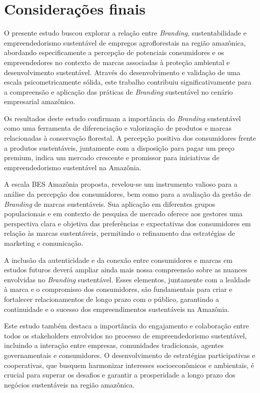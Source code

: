 \chapter{Considerações finais}

O presente estudo buscou explorar a relação entre \textit{Branding}, sustentabilidade e empreendedorismo sustentável de empregos agroflorestais na região amazônica, abordando especificamente a percepção de potenciais consumidores e os empreendedores no contexto de marcas associadas à proteção ambiental e desenvolvimento sustentável. Através do desenvolvimento e validação de uma escala psicometricamente sólida, este trabalho contribuiu significativamente para a compreensão e aplicação das práticas de \textit{Branding} sustentável no cenário empresarial amazônico.

Os resultados deste estudo confirmam a importância do \textit{Branding} sustentável como uma ferramenta de diferenciação e valorização de produtos e marcas relacionadas à conservação florestal. A percepção positiva dos consumidores frente a produtos sustentáveis, juntamente com a disposição para pagar um preço premium, indica um mercado crescente e promissor para iniciativas de empreendedorismo sustentável na Amazônia.

A escala BES Amazônia proposta, revelou-se um instrumento valioso para a análise da percepção dos consumidores, bem como para a avaliação da gestão de \textit{Branding} de marcas sustentáveis. Sua aplicação em diferentes grupos populacionais e em contexto de pesquisa de mercado oferece aos gestores uma perspectiva clara e objetiva das preferências e expectativas dos consumidores em relação às marcas sustentáveis, permitindo o refinamento das estratégias de marketing e comunicação.

A inclusão da autenticidade e da conexão entre consumidores e marcas em estudos futuros deverá ampliar ainda mais nossa compreensão sobre as nuances envolvidas no \textit{Branding} sustentável. Esses elementos, juntamente com a lealdade à marca e o compromisso dos consumidores, são fundamentais para criar e fortalecer relacionamentos de longo prazo com o público, garantindo a continuidade e o sucesso dos empreendimentos sustentáveis na Amazônia.

Este estudo também destaca a importância do engajamento e colaboração entre todos os stakeholders envolvidos no processo de empreendedorismo sustentável, incluindo a interação entre empresas, comunidades tradicionais, agentes governamentais e consumidores. O desenvolvimento de estratégias participativas e cooperativas, que busquem harmonizar interesses socioeconômicos e ambientais, é crucial para superar os desafios e garantir a prosperidade a longo prazo dos negócios sustentáveis na região amazônica.

